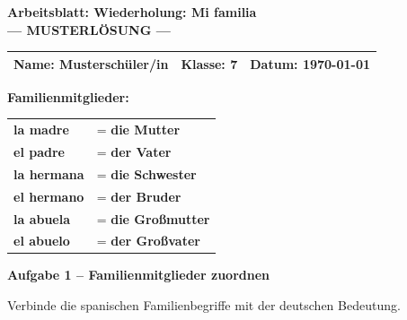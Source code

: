 \documentclass[11pt, a4paper]{article}
\newcommand{\fachfarbe}{spanisch}
\newcommand{\thema}{Wiederholung: Mi familia}
\newcommand{\klasse}{7}
\newcommand{\datum}{\today}
\newcommand{\punktebox}[1]{\hfill\fbox{\small \_/#1}}
\newcommand{\loesung}[1]{\textcolor{loesung}{\textbf{#1}}}
\newenvironment{aufgabe}[1]{%
    \needspace{5\baselineskip}%
    \nopagebreak[4]%
    \vspace{10pt}
    \noindent\textbf{\textcolor{\fachfarbe}{Aufgabe #1}}
    \nopagebreak[4]%
    \vspace{5pt}
    \nopagebreak[4]%
    \begin{list}{}{\leftmargin=0pt}
    \item[]
}{%
    \end{list}
}
\newcommand{\es}[1]{\textcolor{\fachfarbe}{\textbf{#1}}}
\begin{document}

\begin{center}
    {\Large\bfseries\textcolor{\fachfarbe}{Arbeitsblatt: \thema}}\\[0.3em]
    {\large\textcolor{loesung}{\textbf{--- MUSTERLÖSUNG ---}}}
\end{center}

\vspace{5pt}

\noindent
\begin{tabularx}{\textwidth}{|X|X|X|}
\hline
\textbf{Name:} \textcolor{loesung}{Musterschüler/in} &
\textbf{Klasse:} \klasse &
\textbf{Datum:} \datum \\
\hline
\end{tabularx}

\vspace{15pt}


\begin{merkkasten}
\textbf{Familienmitglieder:}

\vspace{0.5em}

\begin{tabular}{ll}
\es{la madre} & = \loesung{die Mutter} \\[0.8em]
\es{el padre} & = \loesung{der Vater} \\[0.8em]
\es{la hermana} & = \loesung{die Schwester} \\[0.8em]
\es{el hermano} & = \loesung{der Bruder} \\[0.8em]
\es{la abuela} & = \loesung{die Großmutter} \\[0.8em]
\es{el abuelo} & = \loesung{der Großvater} \\
\end{tabular}
\end{merkkasten}

\vspace{10pt}


\begin{aufgabe}{1 -- Familienmitglieder zuordnen}
Verbinde die spanischen Familienbegriffe mit der deutschen Bedeutung. \punktebox{4}
\end{aufgabe}
\end{document}
